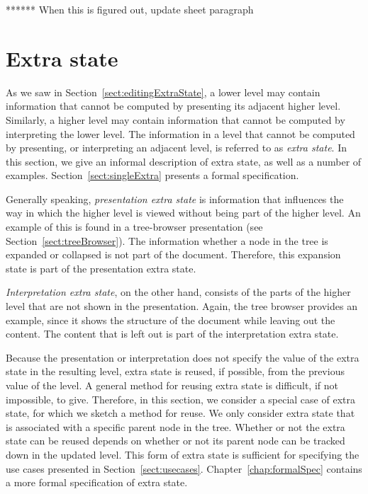 ****** When this is figured out, update sheet paragraph
\ec




%																
%																
%																
\section{Extra state} \label{sect:extraState}



As we saw in Section~\ref{sect:editingExtraState}, a lower level may contain information that cannot be computed by presenting its adjacent higher level. Similarly, a higher level may contain information that cannot be computed by interpreting the lower level. The information in a level that cannot be computed by presenting, or interpreting an adjacent level, is referred to as {\em extra state}. In this section, we give an informal description of extra state, as well as a number of examples. Section~\ref{sect:singleExtra} presents a formal specification.

Generally speaking, {\em presentation extra state} is information that influences the way in which the higher level is viewed without being part of the higher level. An example of this is found in a tree-browser presentation (see Section~\ref{sect:treeBrowser}). The information whether a node in the tree is expanded or collapsed is not part of the document. Therefore, this expansion state is part of the presentation extra state.

{\em Interpretation extra state}, on the other hand, consists of the parts of the higher level that are not shown in the presentation. Again, the tree browser provides an example, since it shows the structure of the document while leaving out the content. The content that is left out is part of the interpretation extra state.

Because the presentation or interpretation does not specify the value of the extra state in the resulting level, extra state is reused, if possible, from the previous value of the level. A general method for reusing extra state is difficult, if not impossible, to give. Therefore, in this section, we consider a special case of extra state, for which we sketch a method for reuse. We only consider extra state that is associated with a specific parent node in the tree. Whether or not the extra state can be reused depends on whether or not its parent node can be tracked down in the updated level. This form of extra state is sufficient for specifying the use cases presented in Section~\ref{sect:usecases}. Chapter~\ref{chap:formalSpec} contains a more formal specification of extra state.



